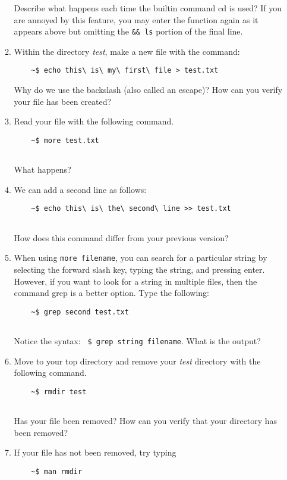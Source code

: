 \documentclass[11 pt,USletter,oneside]{article}
\begin{document}
\begin{enumerate}
\begin{enumerate}
\begin{verbatim}
\end{verbatim}
Describe what happens each time the builtin command cd is used? If you are annoyed by this feature, you may enter the function again as it appears above but omitting the \texttt {\&\& ls} portion of the final line.\\

\item Within the directory \textit {test}, make a new file with the command:
\begin{verbatim}
	~$ echo this\ is\ my\ first\ file > test.txt
\end{verbatim}

Why do we use the backslash (also called an escape)? How can you verify your file has been created?\\
\item Read your file with the following command.
\begin{verbatim}
	~$ more test.txt
	
\end{verbatim}
What happens? \\
\item We can add a second line as follows:
\begin{verbatim}
	~$ echo this\ is\ the\ second\ line >> test.txt
	
\end{verbatim}
How does this command differ from your previous version?\\

\item When using \texttt {more filename}, you can search for a particular string by selecting the forward slash key, typing the string, and pressing enter.  However, if you want to look for a string in multiple files, then the command grep is a better option.  Type the following:

\begin{verbatim}
	~$ grep second test.txt
	
\end{verbatim}
Notice the syntax: \texttt {~\$ grep string filename}.  What is the output?

\item Move to your top directory and remove your \textit {test} directory with the following command.
 
\begin{verbatim}
	~$ rmdir test
	
\end{verbatim}
Has your file been removed? How can you verify that your directory has been removed?\\
\item If your file has not been removed, try typing 
\begin{verbatim}
	~$ man rmdir
	

\end{verbatim}
\end{enumerate}
\end{enumerate}
\end{document}

